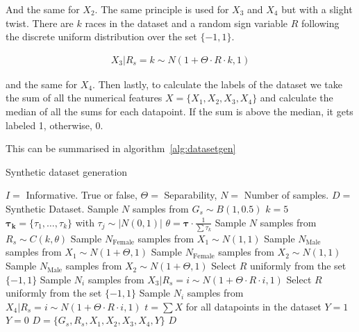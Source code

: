 And the same for $X_2$. The same principle is used for $X_3$ and $X_4$ but with a slight twist. There are $k$ races in the dataset and a random sign variable $R$ following the discrete uniform distribution over the set $\{-1, 1\}$.

\begin{equation*}
    \begin{aligned}
        X_3 | R_s = k \sim N(1 + \Theta \cdot R \cdot k, 1)
    \end{aligned}
\end{equation*}

and the same for $X_4$. Then lastly, to calculate the labels of the dataset we take the sum of all the numerical features $X = \{ X_1, X_2, X_3, X_4 \}$ and calculate the median of all the sums for each datapoint. If the sum is above the median, it gets labeled 1, otherwise, 0.

This can be summarised in algorithm~\ref{alg:datasetgen}

\begin{algorithm}
    \caption{Synthetic dataset generation}
    \begin{algorithmic}
        \REQUIRE $I = $ Informative. True or false, $\Theta = $ Separability, $N =$ Number of samples.
        \ENSURE $D = $ Synthetic Dataset.
        \STATE Sample $N$ samples from $G_s \sim B(1, 0.5)$
        \STATE $k = 5$
        \STATE $\boldsymbol{\tau_k} = \{ \tau_1, \dots, \tau_k \}$ with $\tau_j \sim |N(0, 1)|$
        \STATE $\theta = \boldsymbol{\tau} \cdot \frac{1}{\sum \tau_k}$
        \STATE Sample $N$ samples from $R_s \sim C(k, \theta)$
        \STATE Sample $N_{\text{Female}}$ samples from $X_1 \sim N(1, 1)$
        \STATE Sample $N_{\text{Male}}$ samples from $X_1 \sim N(1 + \Theta, 1)$
        \STATE Sample $N_{\text{Female}}$ samples from $X_2 \sim N(1, 1)$
        \STATE Sample $N_{\text{Male}}$ samples from $X_2 \sim N(1 + \Theta, 1)$
        \STATE Select $R$ uniformly from the set $\{ -1, 1\}$
        \STATE Sample $N_i$ samples from $X_3 | R_s = i \sim N(1 + \Theta \cdot R \cdot i, 1)$
        \STATE Select $R$ uniformly from the set $\{ -1, 1\}$
        \STATE Sample $N_i$ samples from $X_4 | R_s = i \sim N(1 + \Theta \cdot R \cdot i, 1)$
        \ENDFOR
        \STATE $t = \sum X$ for all datapoints in the dataset
        \STATE $Y = 1$
        \ELSE
        \STATE $Y = 0$
        \ENDIF
        \STATE $D = \{G_s, R_s, X_1, X_2, X_3, X_4, Y \}$
        \RETURN $D$
    \end{algorithmic}
    \label{alg:datasetgen}
\end{algorithm}

